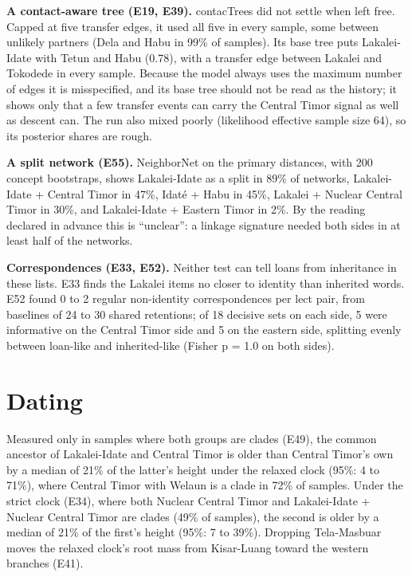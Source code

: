 \documentclass[11pt]{article}
\begin{document}
\textbf{A contact-aware tree (E19, E39).} contacTrees \citep{neureiter2022} did not settle when left free. Capped at five transfer edges, it used all five in every sample, some between unlikely partners (Dela and Habu in 99\% of samples). Its base tree puts Lakalei-Idate with Tetun and Habu (0.78), with a transfer edge between Lakalei and Tokodede in every sample. Because the model always uses the maximum number of edges it is misspecified, and its base tree should not be read as the history; it shows only that a few transfer events can carry the Central Timor signal as well as descent can. The run also mixed poorly (likelihood effective sample size 64), so its posterior shares are rough.

\textbf{A split network (E55).} NeighborNet \citep{bryant2004} on the primary distances, with 200 concept bootstraps, shows Lakalei-Idate as a split in 89\% of networks, Lakalei-Idate + Central Timor in 47\%, Idaté + Habu in 45\%, Lakalei + Nuclear Central Timor in 30\%, and Lakalei-Idate + Eastern Timor in 2\%. By the reading declared in advance this is ``unclear'': a linkage signature needed both sides in at least half of the networks.

\textbf{Correspondences (E33, E52).} Neither test can tell loans from inheritance in these lists. E33 finds the Lakalei items no closer to identity than inherited words. E52 found 0 to 2 regular non-identity correspondences per lect pair, from baselines of 24 to 30 shared retentions; of 18 decisive sets on each side, 5 were informative on the Central Timor side and 5 on the eastern side, splitting evenly between loan-like and inherited-like (Fisher p = 1.0 on both sides).

\section{Dating}\label{sec:dating}

Measured only in samples where both groups are clades (E49), the common ancestor of Lakalei-Idate and Central Timor is older than Central Timor's own by a median of 21\% of the latter's height under the relaxed clock (95\%: 4 to 71\%), where Central Timor with Welaun is a clade in 72\% of samples. Under the strict clock (E34), where both Nuclear Central Timor and Lakalei-Idate + Nuclear Central Timor are clades (49\% of samples), the second is older by a median of 21\% of the first's height (95\%: 7 to 39\%). Dropping Tela-Masbuar moves the relaxed clock's root mass from Kisar-Luang toward the western branches (E41).
\end{document}
